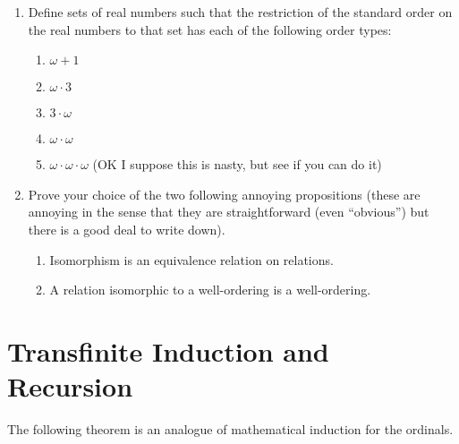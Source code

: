 \documentclass[12pt]{book}
\begin{document}
\begin{enumerate}
\item Define sets of real numbers such that the restriction of the standard order on the real numbers to that set has each of the following order types:

\begin{enumerate}

\item $\omega+1$

\item $\omega\cdot 3$

\item $3\cdot \omega$

\item $\omega\cdot\omega$

\item $\omega\cdot\omega\cdot\omega$ (OK I suppose this is nasty, but see if you can do it)

\end{enumerate}

\item Prove your choice of the two following annoying propositions (these are annoying in the sense that they are straightforward (even ``obvious'') but there is a good deal to write down).

\begin{enumerate}


\item Isomorphism is an equivalence relation on relations.

\item A relation isomorphic to a well-ordering is a well-ordering.

\end{enumerate}

\end{enumerate}

\newpage


\section{Transfinite Induction and Recursion}

The following theorem is an analogue of mathematical induction for the ordinals.
\end{document}
